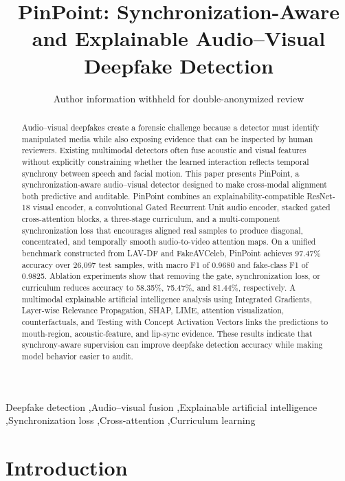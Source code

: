 \documentclass[preprint,12pt,number]{elsarticle}
\begin{document}
\begin{frontmatter}

\title{PinPoint: Synchronization-Aware and Explainable Audio--Visual Deepfake Detection}

\author{Author information withheld for double-anonymized review}

\begin{abstract}
Audio--visual deepfakes create a forensic challenge because a detector must identify manipulated media while also exposing evidence that can be inspected by human reviewers. Existing multimodal detectors often fuse acoustic and visual features without explicitly constraining whether the learned interaction reflects temporal synchrony between speech and facial motion. This paper presents PinPoint, a synchronization-aware audio--visual detector designed to make cross-modal alignment both predictive and auditable. PinPoint combines an explainability-compatible ResNet-18 visual encoder, a convolutional Gated Recurrent Unit audio encoder, stacked gated cross-attention blocks, a three-stage curriculum, and a multi-component synchronization loss that encourages aligned real samples to produce diagonal, concentrated, and temporally smooth audio-to-video attention maps. On a unified benchmark constructed from LAV-DF and FakeAVCeleb, PinPoint achieves 97.47\% accuracy over 26,097 test samples, with macro F1 of 0.9680 and fake-class F1 of 0.9825. Ablation experiments show that removing the gate, synchronization loss, or curriculum reduces accuracy to 58.35\%, 75.47\%, and 81.44\%, respectively. A multimodal explainable artificial intelligence analysis using Integrated Gradients, Layer-wise Relevance Propagation, SHAP, LIME, attention visualization, counterfactuals, and Testing with Concept Activation Vectors links the predictions to mouth-region, acoustic-feature, and lip-sync evidence. These results indicate that synchrony-aware supervision can improve deepfake detection accuracy while making model behavior easier to audit.
\end{abstract}

\begin{keyword}
Deepfake detection \sep Audio--visual fusion \sep Explainable artificial intelligence \sep Synchronization loss \sep Cross-attention \sep Curriculum learning
\end{keyword}

\end{frontmatter}

\linenumbers

\section{Introduction}
\label{sec:introduction}
\end{document}
